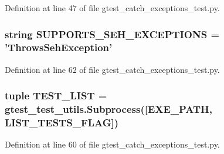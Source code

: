 \-Definition at line 47 of file gtest\-\_\-catch\-\_\-exceptions\-\_\-test.\-py.

\hypertarget{namespacegtest__catch__exceptions__test_ad0541e9612db1575a943ae9328374582}{
\subsubsection[{\-S\-U\-P\-P\-O\-R\-T\-S\-\_\-\-S\-E\-H\-\_\-\-E\-X\-C\-E\-P\-T\-I\-O\-N\-S}]{\setlength{\rightskip}{0pt plus 5cm}string {\bf \-S\-U\-P\-P\-O\-R\-T\-S\-\_\-\-S\-E\-H\-\_\-\-E\-X\-C\-E\-P\-T\-I\-O\-N\-S} = '\-Throws\-Seh\-Exception'}}\label{dd/dbf/namespacegtest__catch__exceptions__test_ad0541e9612db1575a943ae9328374582}


\-Definition at line 62 of file gtest\-\_\-catch\-\_\-exceptions\-\_\-test.\-py.

\hypertarget{namespacegtest__catch__exceptions__test_af311438eeeafe980513dabce72b172b7}{
\subsubsection[{\-T\-E\-S\-T\-\_\-\-L\-I\-S\-T}]{\setlength{\rightskip}{0pt plus 5cm}tuple {\bf \-T\-E\-S\-T\-\_\-\-L\-I\-S\-T} = {\bf gtest\-\_\-test\-\_\-utils.\-Subprocess}(\mbox{[}{\bf \-E\-X\-E\-\_\-\-P\-A\-T\-H}, {\bf \-L\-I\-S\-T\-\_\-\-T\-E\-S\-T\-S\-\_\-\-F\-L\-A\-G}\mbox{]})}}\label{dd/dbf/namespacegtest__catch__exceptions__test_af311438eeeafe980513dabce72b172b7}


\-Definition at line 60 of file gtest\-\_\-catch\-\_\-exceptions\-\_\-test.\-py.

